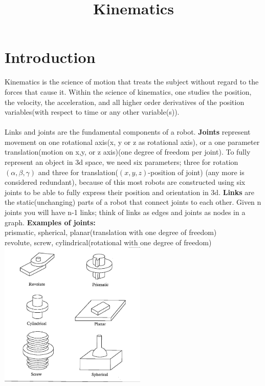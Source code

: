 \documentclass{article}
\title{Kinematics}
\author{}
\date{}
\begin{document}
\maketitle

\section{Introduction}
Kinematics is the science of motion that treats the subject without regard to the forces that cause it. Within the science of kinematics, one studies the position, the velocity, the acceleration, and all higher order derivatives of the position variables(with respect to time or any other variable(s)).\\\\
Links and joints are the fundamental components of a robot. \textbf{Joints} represent movement on one rotational axis(x, y or z as rotational axis), or a one parameter translation(motion on x,y, or z axis)(one degree of freedom per joint). To fully represent an object in 3d space, we need six parameters; three for rotation $(\alpha,\beta,\gamma)$ and three for translation($(x,y,z)$-position of joint) (any more is considered redundant), because of this most robots are constructed using six joints to be able to fully express their position and orientation in 3d. \textbf{Links} are the static(unchanging) parts of a robot that connect joints to each other. Given n joints you will have n-1 links; think of links as edges and joints as nodes in a graph.\newpage
\textbf{Examples of joints:}\\
prismatic, spherical, planar(translation with one degree of freedom)\\
revolute, screw, cylindrical(rotational with one degree of freedom)\\
\includegraphics[width=7cm]{type_of_joints.png} \newpage
\end{document}
